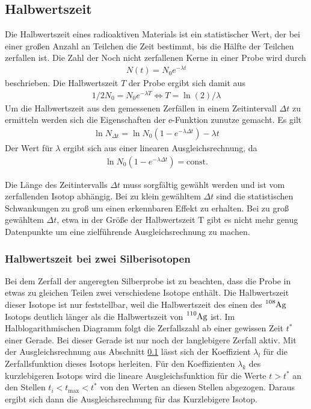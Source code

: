 \subsection{Halbwertszeit}
\label{sec:teo_halbwertszeit}
Die Halbwertszeit eines radioaktiven Materials ist ein statistischer Wert,
der bei einer großen Anzahl an Teilchen die Zeit bestimmt, bis die Hälfte der Teilchen zerfallen ist.
Die Zahl der Noch nicht zerfallenen Kerne in einer Probe wird durch 
\begin{align}
    N(t)= N_0 e^{-\lambda t}
\end{align}
beschrieben.
Die Halbwertszeit $T$ der Probe ergibt sich damit aus
\begin{align}
    1/2 N_0 = N_0 e^{-\lambda T} \Leftrightarrow T = \ln(2)/\lambda
    \label{eq:T_aus_lambda}
\end{align}
Um die Halbwertszeit aus den gemessenen Zerfällen in einem Zeitintervall $\Delta t$
zu ermitteln werden sich die Eigenschaften der e-Funktion zunutze gemacht.
Es gilt
\begin{align}
    \ln N_{\Delta t} = \ln{N_0 (1- e^{-\lambda \Delta t})} - \lambda t
    \label{eq:lambda_aus_N}
\end{align}
Der Wert für $\lambda$ ergibt sich aus einer linearen Ausgleichsrechnung, da
\begin{align*}
    \ln{N_0 (1- e^{-\lambda \Delta t})} = \text{const.}
\end{align*}

\noindent
Die Länge des Zeitintervalls $\Delta t$ muss sorgfältig gewählt werden und ist vom
zerfallenden Isotop abhängig.
Bei zu klein gewähltem $\Delta t$ sind die statistischen Schwankungen zu groß um
einen erkennbaren Effekt zu erhalten. 
Bei zu groß gewähltem $\Delta t$, etwa in der Größe der Halbwertszeit T 
gibt es nicht mehr genug Datenpunkte um eine zielführende Ausgleichsrechnung zu machen.



\subsubsection{Halbwertszeit bei zwei Silberisotopen}
Bei dem Zerfall der angeregten Silberprobe ist zu beachten, dass die Probe in etwas zu 
gleichen Teilen zwei verschiedene Isotope enthält.
Die Halbwertszeit dieser Isotope ist nur feststellbar, weil die Halbwertszeit des einen
des $\ce{^{108}Ag}$ Isotops deutlich länger als die Halbwertszeit von $\ce{^{110}Ag}$ ist.
Im Halblogarithmischen Diagramm folgt die Zerfallszahl ab einer gewissen Zeit $t^{*}$ einer Gerade.
Bei dieser Gerade ist nur noch der langlebigere Zerfall aktiv.
Mit der Ausgleichsrechnung aus Abschnitt \ref{sec:teo_halbwertszeit} 
lässt sich der Koeffizient $\lambda_{l}$ für die Zerfallsfunktion dieses Isotops herleiten.
Für den Koeffizienten $\lambda_{k}$ des kurzlebigeren Isotops
wird die lineare Ausgleichsfunktion für die Werte $t > t^*$ an den Stellen $t_i < t_\text{max} < t^*$ von den
Werten an diesen Stellen abgezogen. 
Daraus ergibt sich dann die Ausgleichsrechnung für das Kurzlebigere Isotop.

